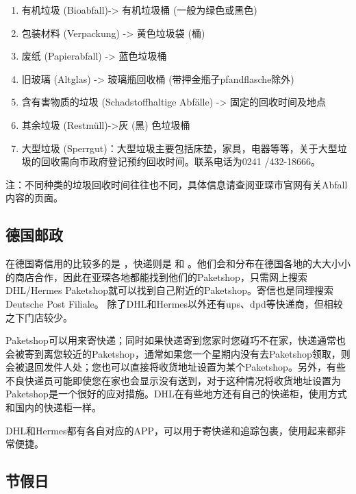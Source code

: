     \begin{enumerate}
      \item 有机垃圾 (Bioabfall)-> 有机垃圾桶 (一般为绿色或黑色)
      \item 包装材料 (Verpackung) -> 黄色垃圾袋 (桶)
      \item 废纸 (Papierabfall) -> 蓝色垃圾桶
      \item 旧玻璃 (Altglas) -> 玻璃瓶回收桶 (带押金瓶子pfandflasche除外)
      \item 含有害物质的垃圾 (Schadstoffhaltige Abfälle) -> 固定的回收时间及地点
      \item 其余垃圾 (Restmüll)->灰 (黑) 色垃圾桶
      \item 大型垃圾 (Sperrgut)：大型垃圾主要包括床垫，家具，电器等等，关于大型垃圾的回收需向市政府登记预约回收时间。联系电话为0241 /432-18666。
    \end{enumerate}

    注：不同种类的垃圾回收时间往往也不同，具体信息请查阅亚琛市官网有关Abfall内容的页面。

  \subsection{德国邮政}\label{subsec:德国邮政}

    在德国寄信用的比较多的是 \href{https://www.deutschepost.de/de.html}{}，快递则是 \href{https://www.dhl.de/de/privatkunden.html}{} 和 \href{https://www.myhermes.de/}{}。他们会和分布在德国各地的大大小小的商店合作，因此在亚琛各地都能找到他们的Paketshop，只需网上搜索DHL/Hermes Paketshop就可以找到自己附近的Paketshop。寄信也是同理搜索Deutsche Post Filiale。 除了DHL和Hermes以外还有ups、dpd等快递商，但相较之下门店较少。

    Paketshop可以用来寄快递；同时如果快递寄到您家时您碰巧不在家，快递通常也会被寄到离您较近的Paketshop，通常如果您一个星期内没有去Paketshop领取，则会被退回发件人处；您也可以直接将收货地址设置为某个Paketshop。另外，有些不良快递员可能即使您在家也会显示没有送到，对于这种情况将收货地址设置为Paketshop是一个很好的应对措施。DHL在有些地方还有自己的快递柜，使用方式和国内的快递柜一样。

    DHL和Hermes都有各自对应的APP，可以用于寄快递和追踪包裹，使用起来都非常便捷。

  \subsection{节假日}\label{subsec:节假日}

